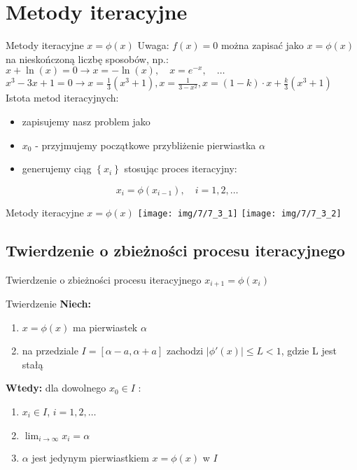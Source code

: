 \section{Metody iteracyjne}
\begin{frame}{Metody iteracyjne $x = \phi(x)$}
Uwaga: $f(x) = 0$ można zapisać  jako $x = \phi(x)$ na nieskończoną  liczbę sposobów, np.:\\
	$x + \ln(x) = 0 \rightarrow x = -\ln(x),\quad x = e^{-x},\quad \ldots$
	$x^{3} - 3x + 1 = 0 \rightarrow x = \frac{1}{3}(x^{3} + 1), x = \frac{1}{3 - x^{2}}, x = (1 - k) \cdot x + \frac{k}{3}(x^{3} + 1)$
	\vspace{0.5}
Istota metod iteracyjnych:
	\begin{itemize}
	    \item zapisujemy nasz problem jako 
		\item $x_{0}$ - przyjmujemy początkowe przybliżenie pierwiastka $\alpha$
		\item generujemy ciąg $\left\{x_{i}\right\}$ stosując proces iteracyjny:
	\end{itemize}
	\[
		x_{i} = \phi(x_{i-1}),\quad i = 1, 2, \ldots \quad 
	\]
\end{frame}
\begin{frame}{Metody iteracyjne $x = \phi(x)$}
	\texttt{[image: img/7/7\_3\_1]}
	\texttt{[image: img/7/7\_3\_2]}
\end{frame}
\subsection{Twierdzenie o zbieżności procesu iteracyjnego}
\begin{frame}{Twierdzenie o zbieżności procesu iteracyjnego $x_{i+1} = \phi(x_{i})$}
	\begin{block}{Twierdzenie}
		\textbf{Niech:}
		\begin{enumerate}
			\item $x = \phi(x)$ ma pierwiastek $\alpha$
			\item na przedziale $I = \left[\alpha - a, \alpha + a\right]$ zachodzi $\lvert \phi'(x) \rvert \leq L < 1$, gdzie L jest stałą
		\end{enumerate}
		\vspace{0.5cm}
		\textbf{Wtedy: } dla dowolnego $x_{0} \in I$ :
		\begin{enumerate}
			\item $x_{i} \in I$, $i = 1, 2, \ldots$
			\item $\lim_{i \rightarrow \infty} x_{i} = \alpha$
			\item $\alpha$ jest jedynym pierwiastkiem $x = \phi(x)$ w $I$
		\end{enumerate}
	\end{block}
\end{frame}

